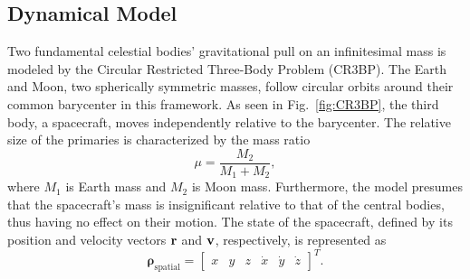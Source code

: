 \documentclass[conference]{IEEEtran}
\begin{document}
\subsection{Dynamical Model}
Two fundamental celestial bodies' gravitational pull on an infinitesimal mass is modeled by the Circular Restricted Three-Body Problem (CR3BP). The Earth and Moon, two spherically symmetric masses, follow circular orbits around their common barycenter in this framework. As seen in Fig.~\ref{fig:CR3BP}, the third body, a spacecraft, moves independently relative to the barycenter. The relative size of the primaries is characterized by the mass ratio
\begin{equation}
	\mu = \frac{M_2}{M_1 + M_2},
\end{equation}
where \( M_1 \) is Earth mass and \( M_2 \) is Moon mass.
Furthermore, the model presumes that the spacecraft's mass is insignificant relative to that of the central bodies, thus having no effect on their motion.
The state of the spacecraft, defined by its position and velocity vectors \( \vb{r}\) and \( \vb{v}\), respectively, is represented as
\begin{equation}
	\boldsymbol{\rho}_{\text{spatial}} = \begin{bmatrix} x & y & z & \dot{x} & \dot{y} & \dot{z} \end{bmatrix}^T.
\end{equation}
\end{document}
